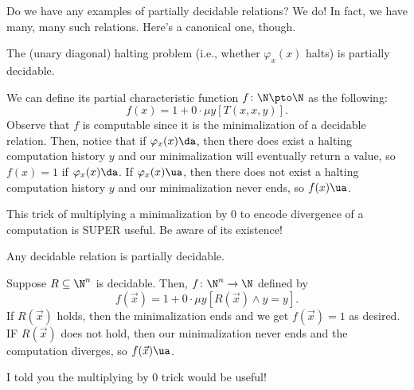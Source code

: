 \documentclass[class=article, crop=false]{standalone}
\begin{document}
Do we have any examples of partially decidable relations? We do! In fact, we have many, many such relations. Here's a canonical one, though.

\begin{ex}{\label{ex:unary-diagonal-halting-is-partially-decidable}}
  The (unary diagonal) halting problem (i.e., whether $\varphi_x(x)$ halts) is partially decidable.

  \begin{pf}
    We can define its partial characteristic function $f \colon \N \pto \N$ as the following:
      \[
        f(x) = 1 + 0 \cdot \mu y [T(x,x,y)].
      \]
    Observe that $f$ is computable since it is the minimalization of a decidable relation. Then, notice that if $\varphi_x(x) \da$, then there does exist a halting computation history $y$ and our minimalization will eventually return a value, so $f(x) = 1$ if $\varphi_x(x) \da$. If $\varphi_x(x) \ua$, then there does not exist a halting computation history $y$ and our minimalization never ends, so $f(x) \ua$.
  \end{pf}
\end{ex}
\begin{rem}
  This trick of multiplying a minimalization by $0$ to encode divergence of a computation is SUPER useful. Be aware of its existence!
\end{rem}

\begin{ex}{\label{ex:decidable-implies-partially-decidable}}
  Any decidable relation is partially decidable.

  \begin{pf}
    Suppose $R \subseteq \N^n$ is decidable. Then, $f \colon \N^n \to \N$ defined by
      \[
        f(\vec x) = 1 + 0\cdot \mu y[R(\vec x) \land y=y].
      \]
    If $R(\vec x)$ holds, then the minimalization ends and we get $f(\vec x) = 1$ as desired. IF $R( \vec x)$ does not hold, then our minimalization never ends and the computation diverges, so $f(\vec x) \ua$.
  \end{pf}
\end{ex}
\begin{rem}
  I told you the multiplying by $0$ trick would be useful!
\end{rem}
\end{document}
